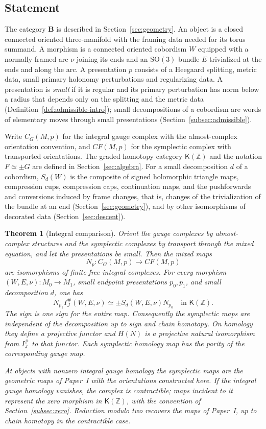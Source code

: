\documentclass[11pt]{amsart}
\theoremstyle{definition}
\theoremstyle{remark}
\theoremstyle{plain}
\newtheorem{thmletter}{Theorem}
\numberwithin{equation}{section}
\newcommand{\ZZ}{\mathbb Z}
\newcommand{\cK}{\mathsf K}
\newcommand{\bB}{\mathbf B}
\newcommand{\SO}{\mathrm{SO}}
\newcommand{\CF}{\mathit{CF}}
\newcommand{\IG}{I^{\#}_{J}}
\begin{document}
\subsection{Statement}
The category $\bB$ is described in Section~\ref{sec:geometry}. An object is a closed connected
oriented three-manifold with the framing data needed for its torus summand. A morphism is a
connected oriented cobordism $W$ equipped with a normally framed arc $\nu$ joining its ends and an
$\SO(3)$ bundle $E$ trivialized at the ends and along the arc. A presentation $p$ consists of a
Heegaard splitting, metric data, small primary holonomy perturbations and regularizing data. A
presentation is \emph{small} if it is regular and its primary perturbation has norm below a
radius that depends only on the splitting and the metric data
(Definition~\ref{def:admissible-intro}); small decompositions of a cobordism are words of
elementary moves through small presentations (Section~\ref{subsec:admissible}).

Write $C_G(M,p)$ for the integral gauge complex with the almost-complex orientation convention, and
$\CF(M,p)$ for the symplectic complex with transported orientations. The graded homotopy category
$\cK(\ZZ)$ and the notation $F\simeq\pm G$ are defined in Section~\ref{sec:algebra}. For a
small decomposition $d$ of a cobordism, $S_d(W)$ is the composite of signed holomorphic
triangle maps, compression cups, compression caps, continuation maps, and the pushforwards and
conversions induced by frame changes, that is, changes of the trivialization of the bundle at an end (Section~\ref{sec:geometry}), and by other isomorphisms of decorated data (Section~\ref{sec:descent}).

\begin{thmletter}[Integral comparison]\label{thm:A}
Orient the gauge complexes by almost-complex structures and the symplectic complexes by transport through the mixed equation, and let the presentations be small. Then the mixed maps
\[
 N_p:C_G(M,p)\longrightarrow\CF(M,p)
\]
are isomorphisms of finite free integral complexes. For every morphism $(W,E,\nu):M_0\to M_1$,
small endpoint presentations $p_0,p_1$, and small decomposition $d$, one has
\begin{equation}\label{eq:main}
 N_{p_1}\IG(W,E,\nu)\simeq
 \pm S_d(W,E,\nu)N_{p_0}
 \quad\text{in }\cK(\ZZ).
\end{equation}
The sign is one sign for the entire map. Consequently the symplectic maps are independent of the
decomposition up to sign and chain homotopy. On homology they define a projective functor and $H(N)$
is a projective natural isomorphism from $\IG$ to that functor. Each symplectic homology map has the
parity of the corresponding gauge map.

At objects with nonzero integral gauge homology the symplectic maps are the geometric maps of
Paper~I with the orientations constructed here. If the integral gauge homology vanishes, the complex
is contractible; maps incident to it represent the zero morphism in $\cK(\ZZ)$, with the convention
of Section~\ref{subsec:zero}. Reduction modulo two recovers the maps of Paper~I, up to chain homotopy in the contractible case.
\end{thmletter}
\end{document}
